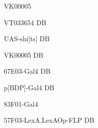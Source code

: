\documentclass[17pt]{extarticle}
\begin{document}
\footnotesize
\vspace*{\fill}
\newpage{}
\vspace*{\fill}\begin{large}
VK00005 \\[0.5em]
\end{large}
\footnotesize
\vspace*{\fill}
\newpage{}
\vspace*{\fill}\begin{normalsize}
VT033654 DB \\[0.5em]
\end{normalsize}
\footnotesize
\vspace*{\fill}
\newpage{}
\vspace*{\fill}\begin{normalsize}
UAS-shi[ts] DB \\[0.5em]
\end{normalsize}
\footnotesize
\vspace*{\fill}
\newpage{}
\vspace*{\fill}\begin{large}
VK00005 DB \\[0.5em]
\end{large}
\footnotesize
\vspace*{\fill}
\newpage{}
\vspace*{\fill}\begin{normalsize}
67E03-Gal4 DB \\[0.5em]
\end{normalsize}
\footnotesize
\vspace*{\fill}
\newpage{}
\vspace*{\fill}\begin{normalsize}
p[BDP]-Gal4 DB \\[0.5em]
\end{normalsize}
\footnotesize
\vspace*{\fill}
\newpage{}
\vspace*{\fill}\begin{large}
83F01-Gal4 \\[0.5em]
\end{large}
\footnotesize
\vspace*{\fill}
\newpage{}
\vspace*{\fill}\begin{footnotesize}
57F03-LexA,LexAOp-FLP DB \\[0.5em]
\end{footnotesize}
\footnotesize
\vspace*{\fill}
\end{document}
